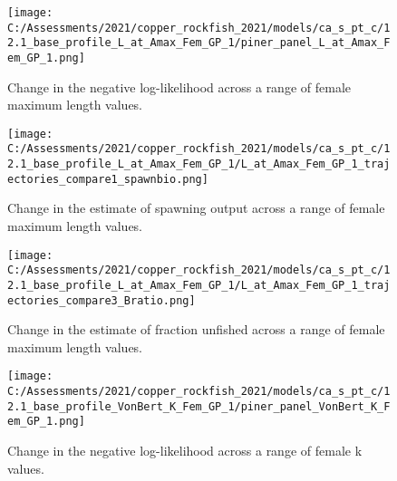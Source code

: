 \documentclass[11pt,
  english,
  a4paper,
]{article}
\begin{document}
\tagmcend\tagstructend


\begin{figure}
\centering
\texttt{[image: C:/Assessments/2021/copper\_rockfish\_2021/models/ca\_s\_pt\_c/12.1\_base\_profile\_L\_at\_Amax\_Fem\_GP\_1/piner\_panel\_L\_at\_Amax\_Fem\_GP\_1.png]}
\caption{Change in the negative log-likelihood across a range of female maximum length values.\label{fig:linf-profile}}
\end{figure}

\tagmcend\tagstructend


\begin{figure}
\centering
\texttt{[image: C:/Assessments/2021/copper\_rockfish\_2021/models/ca\_s\_pt\_c/12.1\_base\_profile\_L\_at\_Amax\_Fem\_GP\_1/L\_at\_Amax\_Fem\_GP\_1\_trajectories\_compare1\_spawnbio.png]}
\caption{Change in the estimate of spawning output across a range of female maximum length values.\label{fig:linf-ssb}}
\end{figure}

\tagmcend\tagstructend


\begin{figure}
\centering
\texttt{[image: C:/Assessments/2021/copper\_rockfish\_2021/models/ca\_s\_pt\_c/12.1\_base\_profile\_L\_at\_Amax\_Fem\_GP\_1/L\_at\_Amax\_Fem\_GP\_1\_trajectories\_compare3\_Bratio.png]}
\caption{Change in the estimate of fraction unfished across a range of female maximum length values.\label{fig:linf-depl}}
\end{figure}

\tagmcend\tagstructend


\begin{figure}
\centering
\texttt{[image: C:/Assessments/2021/copper\_rockfish\_2021/models/ca\_s\_pt\_c/12.1\_base\_profile\_VonBert\_K\_Fem\_GP\_1/piner\_panel\_VonBert\_K\_Fem\_GP\_1.png]}
\caption{Change in the negative log-likelihood across a range of female k values.\label{fig:k-profile}}
\end{figure}
\end{document}
